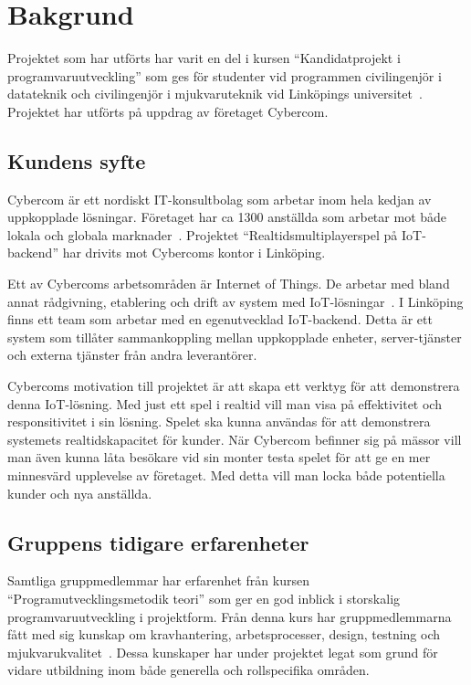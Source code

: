 \chapter{Bakgrund}
\label{cha:background}
Projektet som har utförts har varit en del i kursen ``Kandidatprojekt i programvaruutveckling'' som ges för studenter vid programmen civilingenjör i datateknik och civilingenjör i mjukvaruteknik vid Linköpings universitet~\cite{tddd96}. Projektet har utförts på uppdrag av företaget Cybercom.

\section{Kundens syfte}
\label{sec:customer-aim}
Cybercom är ett nordiskt IT-konsultbolag som arbetar inom hela kedjan av uppkopplade lösningar. Företaget har ca 1300 anställda som arbetar mot både lokala och globala marknader~\cite{cybercomgroup}. Projektet ``Realtidsmultiplayerspel på IoT-backend'' har drivits mot Cybercoms kontor i Linköping.

Ett av Cybercoms arbetsområden är Internet of Things. De arbetar med bland annat rådgivning, etablering och drift av system med IoT-lösningar~\cite{cybercomiot}. I Linköping finns ett team som arbetar med en egenutvecklad IoT-backend. Detta är ett system som tillåter sammankoppling mellan uppkopplade enheter, server-tjänster och externa tjänster från andra leverantörer.

Cybercoms motivation till projektet är att skapa ett verktyg för att demonstrera denna IoT-lösning. Med just ett spel i realtid vill man visa på effektivitet och responsitivitet i sin lösning. Spelet ska kunna användas för att demonstrera systemets realtidskapacitet för kunder. När Cybercom befinner sig på mässor vill man även kunna låta besökare vid sin monter testa spelet för att ge en mer minnesvärd upplevelse av företaget. Med detta vill man locka både potentiella kunder och nya anställda.

\section{Gruppens tidigare erfarenheter}
\label{sec:earlier-experience}
Samtliga gruppmedlemmar har erfarenhet från kursen ``Programutvecklingsmetodik teori'' som ger en god inblick i storskalig programvaruutveckling i projektform. Från denna kurs har gruppmedlemmarna fått med sig kunskap om kravhantering, arbetsprocesser, design, testning och mjukvarukvalitet~\cite{tddc93}. Dessa kunskaper har under projektet legat som grund för vidare utbildning inom både generella och rollspecifika områden.

